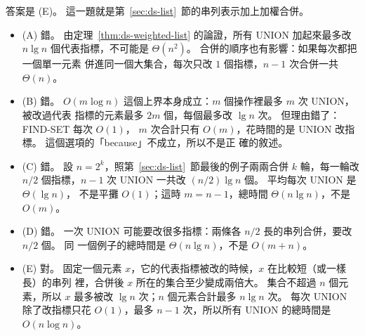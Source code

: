 答案是 (E)。 這一題就是第~\ref{sec:ds-list}~節的串列表示加上加權合併。
\begin{itemize}
\item (A) 錯。 由定理~\ref{thm:ds-weighted-list} 的論證，所有 UNION 加起來最多改
$n \lg n$ 個代表指標，不可能是 $\Theta(n^2)$。 合併的順序也有影響：如果每次都把一個單一元素
併進同一個大集合，每次只改 $1$ 個指標，$n - 1$ 次合併一共 $\Theta(n)$。
\item (B) 錯。 $O(m \log n)$ 這個上界本身成立：$m$ 個操作裡最多 $m$ 次 UNION，被改過代表
指標的元素最多 $2m$ 個，每個最多改 $\lg n$ 次。 但理由錯了：FIND-SET 每次 $O(1)$，
$m$ 次合計只有 $O(m)$，花時間的是 UNION 改指標。 這個選項的「because」不成立，所以不是正
確的敘述。
\item (C) 錯。 設 $n = 2^k$，照第~\ref{sec:ds-list}~節最後的例子兩兩合併 $k$ 輪，每一輪改
$n/2$ 個指標，$n - 1$ 次 UNION 一共改 $(n/2)\lg n$ 個。 平均每次 UNION 是 $\Theta(\lg n)$，
不是平攤 $O(1)$；這時 $m = n - 1$，總時間 $\Theta(n \lg n)$，不是 $O(m)$。
\item (D) 錯。 一次 UNION 可能要改很多指標：兩條各 $n/2$ 長的串列合併，要改 $n/2$ 個。 同
一個例子的總時間是 $\Theta(n \lg n)$，不是 $O(m + n)$。
\item (E) 對。 固定一個元素 $x$，它的代表指標被改的時候，$x$ 在比較短（或一樣長）的串列
裡，合併後 $x$ 所在的集合至少變成兩倍大。 集合不超過 $n$ 個元素，所以 $x$ 最多被改
$\lg n$ 次；$n$ 個元素合計最多 $n \lg n$ 次。 每次 UNION 除了改指標只花 $O(1)$，最多
$n - 1$ 次，所以所有 UNION 的總時間是 $O(n \log n)$。
\end{itemize}


